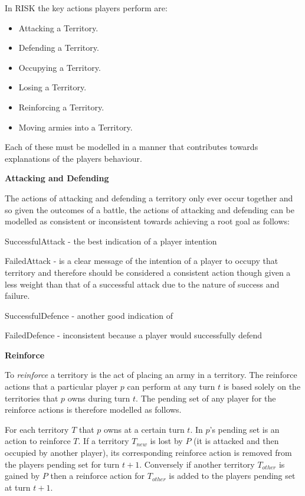 \documentclass[parskip]{cs4rep}
\begin{document}
In RISK the key actions players perform are:

\begin{itemize}
\item
Attacking a Territory.
\item
Defending a Territory.
\item
Occupying a Territory.
\item
Losing a Territory.
\item
Reinforcing a Territory.
\item
Moving armies into a Territory.
\newline
\end{itemize}

Each of these must be modelled in a manner that contributes towards explanations of the players behaviour.

\textbf{Attacking and Defending}

The actions of attacking and defending a territory only ever occur together and so given the outcomes of a battle, the actions of attacking and defending can be modelled as consistent or inconsistent towards achieving a root goal as follows:

SuccessfulAttack - the best indication of a player intention

FailedAttack - is a clear message of the intention of a player to occupy that territory and therefore should be considered a consistent action though given a less weight than that of a successful attack due to the nature of success and failure.

SuccessfulDefence - another good indication of 

FailedDefence - inconsistent because a player would successfully defend 

\textbf{Reinforce}

To \textit{reinforce} a territory is the act of placing an army in a territory. The reinforce actions that a particular player $p$ can perform at any turn $t$ is based solely on the territories that $p$ owns during turn $t$. The pending set of any player for the reinforce actions is therefore modelled as follows. 

For each territory $T$ that $p$ owns at a certain turn $t$. In $p$'s pending set is an action to reinforce $T$. If a territory $T_{new}$ is lost by $P$ (it is attacked and then occupied by another player), its corresponding reinforce action is removed from the players pending set for turn $t+1$. Conversely if another territory $T_{other}$ is gained by $P$ then a reinforce action for $T_{other}$ is added to the players pending set at turn $t+1$.\newline
\end{document}
